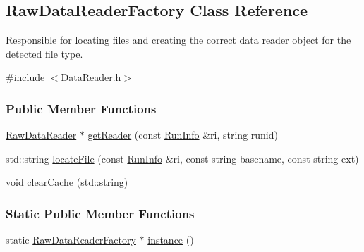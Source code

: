 \hypertarget{classRawDataReaderFactory}{
\subsection{RawDataReaderFactory Class Reference}
\label{classRawDataReaderFactory}
}


Responsible for locating files and creating the correct data reader object for the detected file type.  




{\ttfamily \#include $<$DataReader.h$>$}

\subsubsection*{Public Member Functions}
\begin{DoxyCompactItemize}
\item 
\hypertarget{classRawDataReaderFactory_ad71f80e5d4c526804c7feedec2368f83}{
\hyperlink{classRawDataReader}{RawDataReader} $\ast$ \hyperlink{classRawDataReaderFactory_ad71f80e5d4c526804c7feedec2368f83}{getReader} (const \hyperlink{classRunInfo}{RunInfo} \&ri, string runid)}
\label{classRawDataReaderFactory_ad71f80e5d4c526804c7feedec2368f83}

\item 
std::string \hyperlink{classRawDataReaderFactory_a3d5b99e24dd4f14a554750b2beb41970}{locateFile} (const \hyperlink{classRunInfo}{RunInfo} \&ri, const string basename, const string ext)
\item 
\hypertarget{classRawDataReaderFactory_a67fb5818c0d0f526c3ac165ada0e5173}{
void \hyperlink{classRawDataReaderFactory_a67fb5818c0d0f526c3ac165ada0e5173}{clearCache} (std::string)}
\label{classRawDataReaderFactory_a67fb5818c0d0f526c3ac165ada0e5173}

\end{DoxyCompactItemize}
\subsubsection*{Static Public Member Functions}
\begin{DoxyCompactItemize}
\item 
\hypertarget{classRawDataReaderFactory_a31ce95b89ad844dfc81a9157ef6ba4e7}{
static \hyperlink{classRawDataReaderFactory}{RawDataReaderFactory} $\ast$ \hyperlink{classRawDataReaderFactory_a31ce95b89ad844dfc81a9157ef6ba4e7}{instance} ()}
\label{classRawDataReaderFactory_a31ce95b89ad844dfc81a9157ef6ba4e7}

\end{DoxyCompactItemize}


